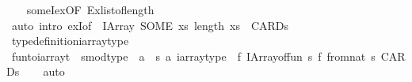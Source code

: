\begin{isabellebody}
\ \ %
\endisadelimproof
%
\isatagproof
{}\isamarkupfalse%
\ someI{\isacharunderscore}{\kern0pt}ex{\isacharbrackleft}{\kern0pt}OF\ Ex{\isacharunderscore}{\kern0pt}list{\isacharunderscore}{\kern0pt}of{\isacharunderscore}{\kern0pt}length{\isacharbrackright}{\kern0pt}\isanewline
\ \ \isamarkupfalse%
\ {\isacharparenleft}{\kern0pt}auto\ intro{\isacharbang}{\kern0pt}{\isacharcolon}{\kern0pt}\ exI{\isacharbrackleft}{\kern0pt}of\ {\isacharunderscore}{\kern0pt}\ {\isachardoublequoteopen}IArray\ {\isacharparenleft}{\kern0pt}SOME\ xs{\isachardot}{\kern0pt}\ length\ xs\ {\isacharequal}{\kern0pt}\ CARD{\isacharparenleft}{\kern0pt}{\isacharprime}{\kern0pt}s{\isacharparenright}{\kern0pt}{\isacharparenright}{\kern0pt}{\isachardoublequoteclose}{\isacharbrackright}{\kern0pt}{\isacharparenright}{\kern0pt}%
\endisatagproof
{\isafoldproof}%
%
\isadelimproof
\isanewline
%
\endisadelimproof
\isanewline
{}\isamarkupfalse%
\ type{\isacharunderscore}{\kern0pt}definition{\isacharunderscore}{\kern0pt}iarray{\isacharunderscore}{\kern0pt}type\isanewline
\isanewline
{}\isamarkupfalse%
\ fun{\isacharunderscore}{\kern0pt}to{\isacharunderscore}{\kern0pt}iarray{\isacharunderscore}{\kern0pt}t\ {\isacharcolon}{\kern0pt}{\isacharcolon}{\kern0pt}\ {\isachardoublequoteopen}{\isacharparenleft}{\kern0pt}{\isacharprime}{\kern0pt}s{\isacharcolon}{\kern0pt}{\isacharcolon}{\kern0pt}{\isacharbraceleft}{\kern0pt}mod{\isacharunderscore}{\kern0pt}type{\isacharbraceright}{\kern0pt}\ {\isasymRightarrow}\ {\isacharprime}{\kern0pt}a{\isacharparenright}{\kern0pt}\ {\isasymRightarrow}\ {\isacharparenleft}{\kern0pt}{\isacharprime}{\kern0pt}s{\isacharcomma}{\kern0pt}\ {\isacharprime}{\kern0pt}a{\isacharparenright}{\kern0pt}\ iarray{\isacharunderscore}{\kern0pt}type{\isachardoublequoteclose}\ \ {\isachardoublequoteopen}{\isasymlambda}f{\isachardot}{\kern0pt}\ IArray{\isachardot}{\kern0pt}of{\isacharunderscore}{\kern0pt}fun\ {\isacharparenleft}{\kern0pt}{\isasymlambda}s{\isachardot}{\kern0pt}\ f\ {\isacharparenleft}{\kern0pt}from{\isacharunderscore}{\kern0pt}nat\ s{\isacharparenright}{\kern0pt}{\isacharparenright}{\kern0pt}\ {\isacharparenleft}{\kern0pt}CARD{\isacharparenleft}{\kern0pt}{\isacharprime}{\kern0pt}s{\isacharparenright}{\kern0pt}{\isacharparenright}{\kern0pt}{\isachardoublequoteclose}\isanewline
%
\isadelimproof
\ \ %
\endisadelimproof
%
\isatagproof
{}\isamarkupfalse%
\ auto%
\endisatagproof
{\isafoldproof}%
%
\isadelimproof
\isanewline

\end{isabellebody}
